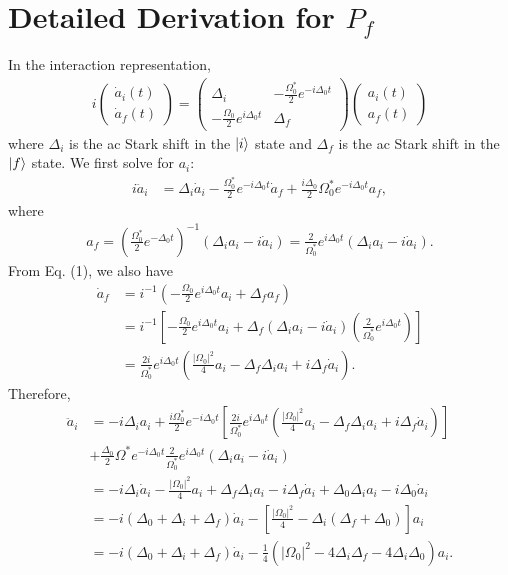 \documentclass{article}
\begin{document}
\section{Detailed Derivation for $P_f$}
In the interaction representation,
\begin{align}
\boxed{i\begin{pmatrix}
\dot{a}_i(t)\\
\dot{a}_f(t)
\end{pmatrix}
=
\begin{pmatrix}
\Delta_i & -\frac{\Omega^{*}_{0}}{2}e^{-i\Delta_0t}\\
-\frac{\Omega_0}{2}e^{i\Delta_0t} & \Delta_f
\end{pmatrix}
\begin{pmatrix}
a_i(t)\\
a_f(t)
\end{pmatrix}}
\end{align}
where $\Delta_i$ is the ac Stark shift in the $\ket{i}$ state and $\Delta_f$ is the ac Stark shift in the $\ket{f}$ state. We first solve for $a_i$:
\begin{align}
i\ddot{a}_i &= \Delta_i \dot{a}_i - \frac{\Omega^*_0}{2}e^{-i\Delta_0t}\dot{a}_f + \frac{i\Delta_0}{2}\Omega^*_0e^{-i\Delta_0t}a_f,
\end{align}
where
\begin{align}
a_f = \left(\frac{\Omega^*_0}{2}e^{-\Delta_0t} \right)^{-1}\left( \Delta_ia_i-i\dot{a}_i\right) = \frac{2}{\Omega^*_0}e^{i\Delta_0t} \left(\Delta_ia_i - i\dot{a}_i \right) . 
\end{align}
From Eq. (1), we also have
\begin{align}
\dot{a}_f &= i^{-1}\left( -\frac{\Omega_0}{2}e^{i\Delta_0t}a_i + \Delta_fa_f \right) \nonumber\\
&= i^{-1}\left[ -\frac{\Omega_0}{2}e^{i\Delta_0t}a_i + \Delta_f\left(\Delta_ia_i-i\dot{a}_i \right)\left(\frac{2}{\Omega^*_0}e^{i\Delta_0t} \right)   \right] \nonumber\\
&= \frac{2i}{\Omega^*_0}e^{i\Delta_0t}\left( \frac{\vert \Omega_0\vert^2}{4}a_i - \Delta_f\Delta_ia_i + i\Delta_f\dot{a}_i \right). 
\end{align}
Therefore,
\begin{align}
\ddot{a}_i &= -i\Delta_ia_i + \frac{i\Omega^*_0}{2}e^{-i\Delta_0t}\left[\frac{2i}{\Omega^*_0}e^{i\Delta_0t}\left( \frac{\vert \Omega_0\vert^2}{4}a_i - \Delta_f\Delta_ia_i + i\Delta_f\dot{a}_i \right) \right] \nonumber \\
&+ \frac{\Delta_0}{2}\Omega^*e^{-i\Delta_0t}\frac{2}{\Omega^*_0}e^{i\Delta_0t} \left(\Delta_ia_i - i\dot{a}_i \right) \nonumber\\
&= -i\Delta_i\dot{a}_i - \frac{\vert \Omega_0\vert^2}{4}a_i + \Delta_f\Delta_ia_i - i\Delta_f\dot{a}_i + \Delta_0\Delta_ia_i - i\Delta_0\dot{a}_i \nonumber\\
&= -i\left( \Delta_0 + \Delta_i + \Delta_f\right)\dot{a}_i - \left[ \frac{\vert \Omega_0\vert^2}{4} - \Delta_i\left( \Delta_f + \Delta_0 \right)  \right]a_i \nonumber\\
&= -i\left( \Delta_0 + \Delta_i + \Delta_f\right)\dot{a}_i - \frac{1}{4}\left( \vert\Omega_0\vert^2 - 4\Delta_i\Delta_f - 4\Delta_i\Delta_0 \right)a_i.
\end{align}
\end{document}
